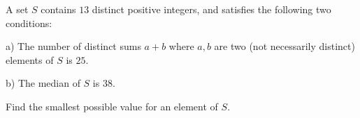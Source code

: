A set $S$ contains $13$ distinct positive integers, and satisfies the following two conditions:

a) The number of distinct sums $a + b$ where $a, b$ are two (not necessarily distinct) elements of $S$ is $25$.

b) The median of $S$ is $38$.

Find the smallest possible value for an element of $S$.
